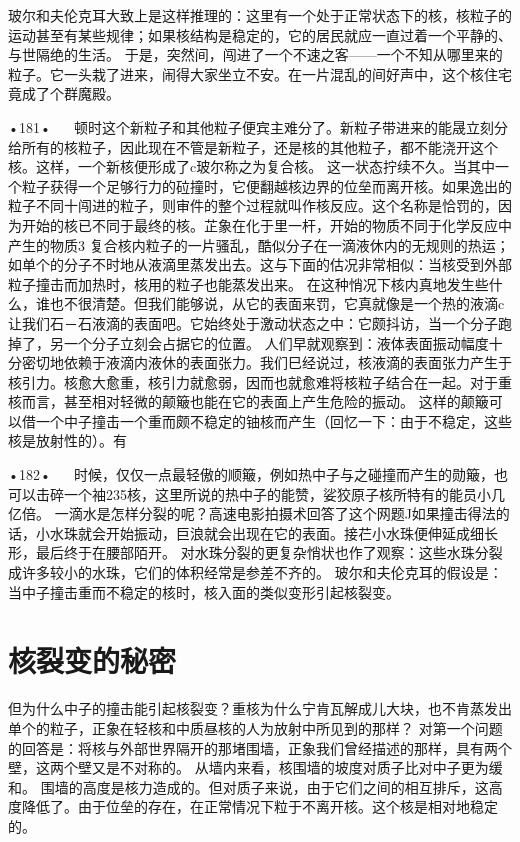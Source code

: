 玻尔和夫伦克耳大致上是这样推理的：这里有一个处于正常状态下的核，核粒子的运动甚至有某些规律；如果核结构是稳定的，它的居民就应一直过着一个平静的、与世隔绝的生活。
于是，突然间，闯进了一个不速之客——一个不知从哪里来的粒子。它一头栽了进来，闹得大家坐立不安。在一片混乱的间好声中，这个核住宅竟成了个群魔殿。

•181•
  
顿时这个新粒子和其他粒子便宾主难分了。新粒子带进来的能晟立刻分给所有的核粒子，因此现在不管是新粒子，还是核的其他粒子，都不能浇开这个核。这样，一个新核便形成了c玻尔称之为复合核。
这一状态拧续不久。当其中一个粒子获得一个足够行力的砬撞时，它便翻越核边界的位垒而离开核。如果逸出的粒子不同十闯进的粒子，则审件的整个过程就叫作核反应。这个名称是恰罚的，因为开始的核已不同于最终的核。芷象在化于里一杆，开始的物质不同于化学反应中产生的物质3
复合核内粒子的一片骚乱，酷似分子在一滴液休内的无规则的热运；如单个的分子不时地从液滴里蒸发出去。这与下面的估况非常相似：当核受到外部粒子撞击而加热时，核用的粒子也能蒸发出来。
在这种悄况下核内真地发生些什么，谁也不很清楚。但我们能够说，从它的表面来罚，它真就像是一个热的液滴c让我们石－石液滴的表面吧。它始终处于激动状态之中：它颇抖访，当一个分子跑掉了，另一个分子立刻会占据它的位置。
人们早就观察到：液体表面振动幅度十分密切地依赖于液滴内液休的表面张力。我们巳经说过，核液滴的表面张力产生于核引力。核愈大愈重，核引力就愈弱，因而也就愈难将核粒子结合在一起。对于重核而言，甚至相对轻微的颠簸也能在它的表面上产生危险的振动。
这样的颠簸可以借一个中子撞击一个重而颇不稳定的铀核而产生（回忆一下：由于不稳定，这些核是放射性的）。有

•182•
  
时候，仅仅一点最轻傲的顺簸，例如热中子与之碰撞而产生的勋簸，也可以击碎一个袖235核，这里所说的热中子的能赞，娑狡原子核所特有的能员小几亿倍。
一滴水是怎样分裂的呢？高速电影拍摄术回答了这个网题J如果撞击得法的话，小水珠就会开始振动，巨浪就会出现在它的表面。接芢小水珠便伸延成细长形，最后终于在腰部陌开。
对水珠分裂的更复杂悄状也作了观察：这些水珠分裂成许多较小的水珠，它们的体积经常是参差不齐的。
玻尔和夫伦克耳的假设是：当中子撞击重而不稳定的核时，核入面的类似变形引起核裂变。

\section{核裂变的秘密}

但为什么中子的撞击能引起核裂变？重核为什么宁肯瓦解成儿大块，也不肯蒸发出单个的粒子，正象在轻核和中质昼核的人为放射中所见到的那样？
对第一个问题的回答是：将核与外部世界隔开的那堵围墙，正象我们曾经描述的那样，具有两个壁，这两个壁又是不对称的。
从墙内来看，核围墙的坡度对质子比对中子更为缓和。
围墙的高度是核力造成的。但对质子来说，由于它们之间的相互排斥，这高度降低了。由于位垒的存在，在正常情况下粒于不离开核。这个核是相对地稳定的。

